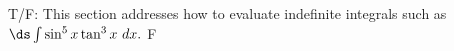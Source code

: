{T/F: This section addresses how to evaluate indefinite integrals such as $\ds \int \sin^5x\tan^3x\ dx.$}
{F}
